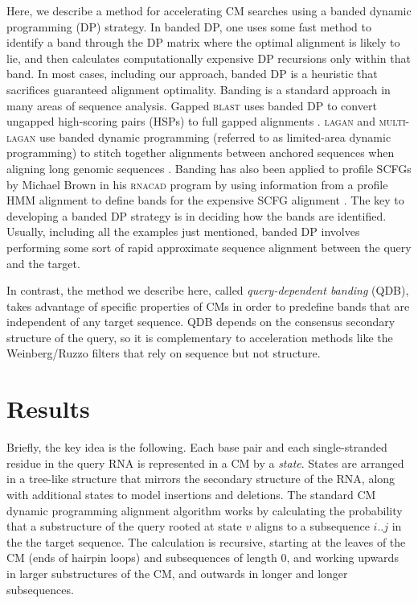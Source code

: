 \documentclass[11pt]{article}
\begin{document}
Here, we describe a method for accelerating CM searches using a banded
dynamic programming (DP) strategy. In banded DP, one uses some fast
method to identify a band through the DP matrix where the optimal
alignment is likely to lie, and then calculates computationally
expensive DP recursions only within that band. In most cases,
including our approach, banded DP is a heuristic that sacrifices
guaranteed alignment optimality. Banding is a standard approach in
many areas of sequence analysis. Gapped \textsc{blast} uses banded DP
to convert ungapped high-scoring pairs (HSPs) to full gapped
alignments \cite{Altschul97}.  \textsc{lagan} and \textsc{multi-lagan}
use banded dynamic programming (referred to as limited-area dynamic
programming) to stitch together alignments between anchored sequences
when aligning long genomic sequences \cite{Brudno03}. Banding has also been
applied to profile SCFGs by Michael Brown in his \textsc{rnacad}
program by using information from a profile HMM alignment to define
bands for the expensive SCFG alignment \cite{Brown00}. The key to
developing a banded DP strategy is in deciding how the bands are
identified.  Usually, including all the examples just mentioned,
banded DP involves performing some sort of rapid approximate sequence
alignment between the query and the target.

In contrast, the method we describe here, called \emph{query-dependent
banding} (QDB), takes advantage of specific properties of CMs in order
to predefine bands that are independent of any target sequence.  QDB
depends on the consensus secondary structure of the query, so it is
complementary to acceleration methods like the Weinberg/Ruzzo filters
that rely on sequence but not structure.



\section{Results}

Briefly, the key idea is the following. Each base pair and each
single-stranded residue in the query RNA is represented in a CM by a
\emph{state}. States are arranged in a tree-like structure that
mirrors the secondary structure of the RNA, along with additional
states to model insertions and deletions. The standard CM dynamic
programming alignment algorithm works by calculating the probability
that a substructure of the query rooted at state $v$ aligns to a
subsequence $i..j$ in the the target sequence. The calculation is
recursive, starting at the leaves of the CM (ends of hairpin loops)
and subsequences of length 0, and working upwards in larger
substructures of the CM, and outwards in longer and longer
subsequences.
\end{document}
